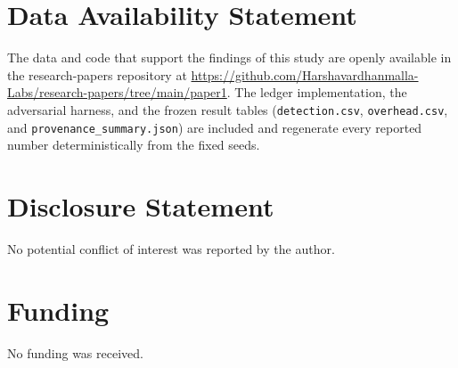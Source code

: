 \documentclass[journal]{IEEEtran}
\begin{document}
\section*{Data Availability Statement}
The data and code that support the findings of this study are openly
available in the research-papers repository at
\url{https://github.com/Harshavardhanmalla-Labs/research-papers/tree/main/paper1}.
The ledger implementation, the adversarial harness, and the frozen result
tables (\texttt{detection.csv}, \texttt{overhead.csv}, and
\texttt{provenance\_summary.json}) are included and regenerate every reported
number deterministically from the fixed seeds.

\section*{Disclosure Statement}
No potential conflict of interest was reported by the author.

\section*{Funding}
No funding was received.
\end{document}
